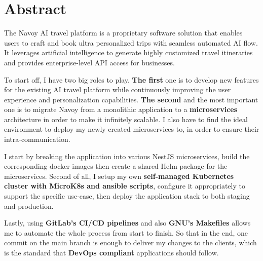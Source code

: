 \section*{Abstract}
The Navoy AI travel platform is a proprietary software solution that enables users to craft and book ultra personalized trips with seamless automated AI flow.
It leverages artificial intelligence to generate highly customized travel itineraries and provides enterprise-level API access for businesses.

To start off, I have two big roles to play.
\textbf{The first} one is to develop new features for the existing AI travel platform while continuously improving the user experience and personalization capabilities.
\textbf{The second} and the most important one is to migrate Navoy from a monolithic application to a \textbf{microservices} architecture in order to make it infinitely scalable. I also have to find the ideal environment to deploy my newly created microservices to, in order to ensure their intra-communication.

I start by breaking the application into various NestJS microservices, build the corresponding docker images then create a shared Helm package for the microservices. Second of all, I setup my own \textbf{self-managed Kubernetes cluster with MicroK8s and ansible scripts}, configure it appropriately to support the specific use-case, then deploy the application stack to both staging and production.

Lastly, using \textbf{GitLab's CI/CD pipelines} and also \textbf{GNU's Makefiles} allows me to automate the whole process from start to finish.
So that in the end, one commit on the main branch is enough to deliver my changes to the clients, which is the standard that \textbf{DevOps compliant} applications should follow.

\newpage
